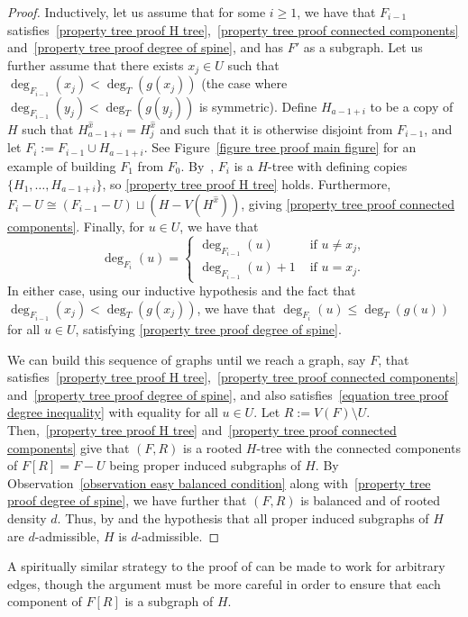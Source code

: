 \documentclass[12pt,letterpaper]{article}
\theoremstyle{definition}
\begin{document}
\begin{proof}
		Inductively, let us assume that for some $i\geq 1$, we have that $F_{i-1}$ satisfies~\ref{property tree proof H tree},~\ref{property tree proof connected components} and~\ref{property tree proof degree of spine}, and has $F'$ as a subgraph. Let us further assume that there exists $x_j\in U$ such that $\deg_{F_{i-1}}(x_j)<\deg_T(g(x_j))$ (the case where $\deg_{F_{i-1}}(y_j)<\deg_T(g(y_j))$ is symmetric). Define $H_{a-1+i}$ to be a copy of $H$ such that  $H_{a-1+i}^{\hat{x}}=H_j^{\hat{x}}$ and such that it is otherwise disjoint from $F_{i-1}$, and let $F_i:=F_{i-1}\cup H_{a-1+i}$. See Figure~\ref{figure tree proof main figure} for an example of building $F_1$ from $F_0$. By~, $F_i$ is a $H$-tree with defining copies $\{H_1,\dots,H_{a-1+i}\}$, so \ref{property tree proof H tree} holds. Furthermore, $F_i-U\cong (F_{i-1}-U)\sqcup (H-V(H^{\hat{x}}))$, giving \ref{property tree proof connected components}. Finally, for $u\in U$, we have that
		\[
		\deg_{F_i}(u)=\begin{cases}
			\deg_{F_{i-1}}(u)&\text{ if }u\neq x_j,\\
			\deg_{F_{i-1}}(u)+1&\text{ if }u=x_j.
		\end{cases}
		\]
		In either case, using our inductive hypothesis and the fact that $\deg_{F_{i-1}}(x_j)<\deg_T(g(x_j))$, we have that $\deg_{F_i}(u)\leq \deg_T(g(u))$ for all $u\in U$, satisfying \ref{property tree proof degree of spine}.
		
		We can build this sequence of graphs until we reach a graph, say $F$, that satisfies~\ref{property tree proof H tree},~\ref{property tree proof connected components} and~\ref{property tree proof degree of spine}, and also satisfies~\eqref{equation tree proof degree inequality} with equality for all $u\in U$. Let $R:=V(F)\setminus U$. Then,~\ref{property tree proof H tree} and~\ref{property tree proof connected components} give that $(F,R)$ is a rooted $H$-tree with the connected components of $F[R]=F-U$ being proper induced subgraphs of $H$. By Observation~\ref{observation easy balanced condition} along with~\ref{property tree proof degree of spine}, we have further that $(F,R)$ is balanced and of rooted density $d$. Thus, by  and the hypothesis that all proper induced subgraphs of $H$ are $d$-admissible, $H$ is $d$-admissible.
	\end{proof}
	
	A spiritually similar strategy to the proof of   can be made to work for arbitrary edges, though the argument must be more careful in order to  ensure that each component of $F[R]$ is a subgraph of $H$.
	
\end{document}
